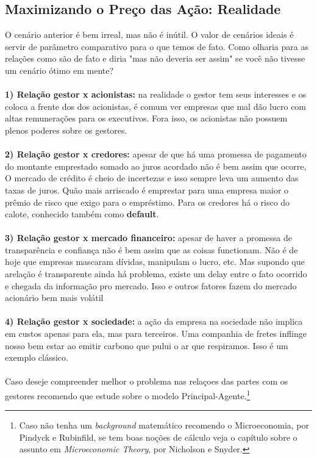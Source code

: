 \subsection*{Maximizando o Preço das Ação: Realidade}
O cenário anterior é bem irreal, mas não é inútil. O valor de cenários ideais é servir de parâmetro comparativo para o que temos de fato. Como olharia para as relações como são de fato e diria "mas não deveria ser assim" se você não tivesse um cenário ótimo em mente? 
\\~\\
\textbf{1) Relação gestor x acionistas:} na realidade o gestor tem seus interesses e os coloca a frente dos dos acionistas, é comum ver empresas que mal dão lucro com altas remunerações para os executivos. Fora isso, os acionistas não possuem plenos poderes sobre os gestores.
\\~\\
\textbf{2) Relação gestor x credores:} apesar de que há uma promessa de pagamento do montante emprestado somado ao juros acordado não é bem assim que ocorre, O mercado de crédito é cheio de incertezas e isso sempre leva um aumento das taxas de juros. Quão mais arriscado é emprestar para uma empresa maior o prêmio de risco que exigo para o empréstimo. Para os credores há o risco do calote, conhecido também como \textbf{default}.
\\~\\
\textbf{3) Relação gestor x mercado financeiro:} apesar de haver a promessa de transparência e confiança não é bem assim que as coisas functionam. Não é de hoje que empresas mascaram dívidas, manipulam o lucro, etc. Mas supondo que arelação é transparente ainda há problema, existe um delay entre o fato ocorrido e chegada da informação pro mercado. Isso e outros fatores fazem do mercado acionário bem mais volátil
\\~\\
\textbf{4) Relação gestor x sociedade:} a ação da empresa na sociedade não implica em custos apenas para ela, mas para terceiros. Uma companhia de fretes inflinge nosso bem estar ao emitir carbono que pului o ar que respiramos. Isso é um exemplo clássico.
\\~\\
Caso deseje compreender melhor o problema nas relaçoes das partes com os gestores recomendo que estude sobre o modelo Principal-Agente.\footnote{Caso não tenha um \textit{background} matemático recomendo o Microeconomia, por Pindyck e Rubinfild, se tem boas noções de cálculo veja o capítulo sobre o assunto em  \textit{Microeconomic Theory}, por Nicholson e Snyder.}

